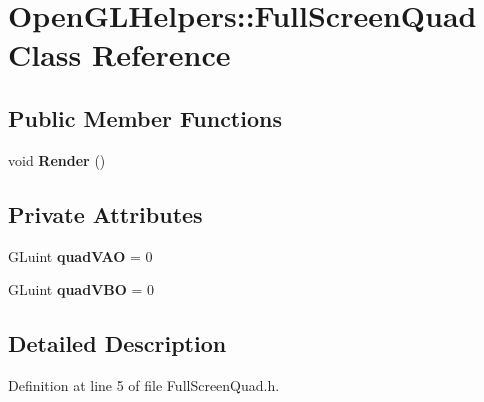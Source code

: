 \hypertarget{class_open_g_l_helpers_1_1_full_screen_quad}{}\section{Open\+G\+L\+Helpers\+:\+:Full\+Screen\+Quad Class Reference}
\label{class_open_g_l_helpers_1_1_full_screen_quad}
\subsection*{Public Member Functions}
\begin{DoxyCompactItemize}
\item 
void {\bfseries Render} ()\hypertarget{class_open_g_l_helpers_1_1_full_screen_quad_a2758c7738ae496e95573fa7ee5e7fdc7}{}\label{class_open_g_l_helpers_1_1_full_screen_quad_a2758c7738ae496e95573fa7ee5e7fdc7}

\end{DoxyCompactItemize}
\subsection*{Private Attributes}
\begin{DoxyCompactItemize}
\item 
G\+Luint {\bfseries quad\+V\+AO} = 0\hypertarget{class_open_g_l_helpers_1_1_full_screen_quad_a770f3df38a60f16641e4917b1db747d8}{}\label{class_open_g_l_helpers_1_1_full_screen_quad_a770f3df38a60f16641e4917b1db747d8}

\item 
G\+Luint {\bfseries quad\+V\+BO} = 0\hypertarget{class_open_g_l_helpers_1_1_full_screen_quad_a2079668e16561c8c7088912bc11d9852}{}\label{class_open_g_l_helpers_1_1_full_screen_quad_a2079668e16561c8c7088912bc11d9852}

\end{DoxyCompactItemize}


\subsection{Detailed Description}


Definition at line 5 of file Full\+Screen\+Quad.\+h.

